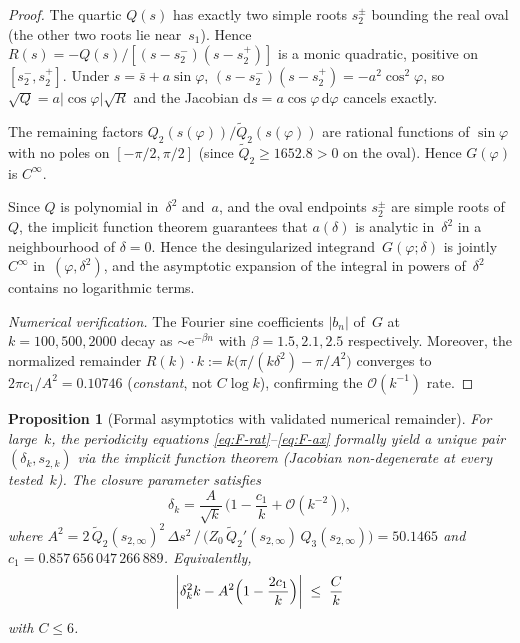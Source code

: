 \documentclass[11pt,a4paper]{article}
\theoremstyle{plain}
\newtheorem{proposition}[theorem]{Proposition}
\theoremstyle{definition}
\theoremstyle{remark}
\newcommand{\dd}{\mathrm{d}}
\newcommand{\ee}{\mathrm{e}}
\newcommand{\Oo}{\mathcal{O}}
\begin{document}
\begin{proof}
  The quartic $Q(s)$ has exactly two simple roots $s_2^\pm$ bounding
  the real oval (the other two roots lie near~$s_1$).
  Hence $R(s) = -Q(s)/[(s-s_2^-)(s-s_2^+)]$ is a
  monic quadratic, positive on $[s_2^-,s_2^+]$.
  Under $s = \bar s + a\sin\varphi$,
  $(s - s_2^-)(s - s_2^+) = -a^2\cos^2\!\varphi$,
  so $\sqrt{Q} = a\lvert\cos\varphi\rvert\sqrt{R}$ and the Jacobian
  $\dd s = a\cos\varphi\,\dd\varphi$ cancels exactly.

  The remaining factors $Q_2(s(\varphi))/\tilde Q_2(s(\varphi))$
  are rational functions of $\sin\varphi$ with no poles on $[-\pi/2,\pi/2]$
  (since $\tilde Q_2 \ge 1652.8 > 0$ on the oval).
  Hence $G(\varphi)$ is $C^\infty$.

  Since $Q$ is polynomial in~$\delta^2$ and~$a$, and the oval endpoints
  $s_2^\pm$ are simple roots of~$Q$, the implicit function theorem
  guarantees that $a(\delta)$ is analytic in~$\delta^2$ in a neighbourhood
  of $\delta = 0$.  Hence the desingularized integrand~$G(\varphi;\delta)$
  is jointly $C^\infty$ in~$(\varphi,\delta^2)$, and the asymptotic
  expansion of the integral in powers of~$\delta^2$ contains no
  logarithmic terms.

  \smallskip
  \emph{Numerical verification.}
  The Fourier sine coefficients $\lvert b_n\rvert$ of~$G$ at
  $k=100,500,2000$ decay as $\sim\!\ee^{-\beta n}$ with
  $\beta = 1.5, 2.1, 2.5$ respectively.  Moreover, the normalized
  remainder $R(k) \cdot k := k\bigl(\pi/(k\delta^2) - \pi/A^2\bigr)$
  converges to $2\pi c_1/A^2 = 0.10746$ (\emph{constant}, not
  $C\log k$), confirming the $\Oo(k^{-1})$ rate.
\end{proof}

\begin{proposition}[Formal asymptotics with validated numerical
  remainder]\label{prop:rigorous-asymp}
  For large~$k$, the periodicity equations
  \eqref{eq:F-rat}--\eqref{eq:F-ax} formally yield a unique pair
  $(\delta_k, s_{2,k})$ via the implicit function theorem
  (Jacobian non-degenerate at every tested~$k$).
  The closure parameter satisfies
  \begin{equation}\label{eq:rigorous-asymp}
    \delta_k
    = \frac{A}{\sqrt{k}}\,\biggl(
        1 - \frac{c_1}{k} + \Oo(k^{-2})
      \biggr),
  \end{equation}
  where $A^2 = 2\,\tilde Q_2(s_{2,\infty})^2\,\Delta s^2\,
  \big/\,\bigl(Z_0\,\tilde Q_2'(s_{2,\infty})\,Q_3(s_{2,\infty})\bigr)
  = 50.1465$
  and $c_1 = 0.857\,656\,047\,266\,889$.
  Equivalently,
  \[
    \biggl\lvert \delta_k^2 k - A^2\Bigl(1 - \frac{2c_1}{k}\Bigr)\biggr\rvert
    \;\le\;
    \frac{C}{k}
  \]
  with $C \le 6$.
\end{proposition}
\end{document}
